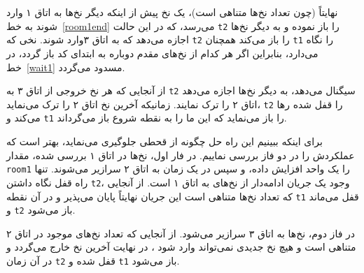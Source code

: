 \documentclass{book}
\begin{document}
    نهایتاً (چون تعداد نخ‌ها متناهی است)، یک نخ پیش از اینکه دیگر نخ‌ها به اتاق ۱ وارد شوند به خط~\ref{room1end} می‌رسد، که در این حالت {\tt t2}
    را باز نموده و به دیگر نخ‌ها اجازه می‌دهد که به اتاق ۳وارد شوند. نخی که  {\tt t2}  را باز می‌کند همچنان  {\tt t1} را نگاه می‌دارد، بنابراین 
    اگر هر کدام از نخ‌های مقدم دوباره به ابتدای کد باز گردد، در خط~\ref{wait1} مسدود می‌گردد. 

    از آنجایی که هر نخ خروجی از اتاق ۳ به  {\tt t2} سیگنال می‌دهد،  به دیگر نخ‌ها اجازه می‌دهد اتاق ۲ را ترک نمایند. 
    زمانیکه آخرین نخ اتاق ۲ را ترک می‌نماید، {\tt t2}  را قفل شده رها می‌کند و  {\tt t1} را باز می‌نماید که این ما را به نقطه شروع باز می‌گرداند. 


    برای اینکه ببینیم این راه حل چگونه از قحطی جلوگیری می‌نماید، بهتر است که عملکردش را در دو فاز بررسی نماییم. 
    در فار اول، نخ‌ها در اتاق ۱ بررسی شده، مقدار {\tt room1} را یک واحد افزایش داده، و سپس در یک زمان به اتاق ۲ سرازیر می‌شوند. 
    تنها راه قفل نگاه داشتن  {\tt t2}، وجود یک جریان ادامه‌دار از نخ‌های به اتاق ۱ است. 
    از آنجایی که تعداد نخ‌ها متناهی است این جریان نهایتاً پایان می‌پذیر و در آن نقطه {\tt t1} قفل می‌ماند و  {\tt t2} باز می‌شود. 
    
    در فاز دوم، نخ‌ها به اتاق ۳ سرازیر می‌شود. از آنجایی که تعداد نخ‌های موجود در اتاق ۲ متناهی است و هیچ نخ جدیدی نمی‌تواند وارد شود ، 
    در نهایت آخرین نخ خارج می‌گردد و در آن زمان  {\tt t2} قفل شده و  {\tt t1} باز می‌شود. 
\end{document}
